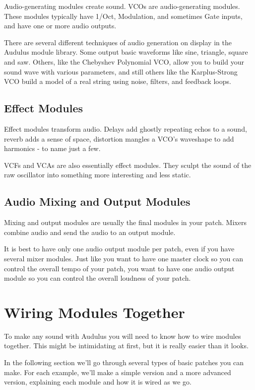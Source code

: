 \documentclass[11pt]{book}
\begin{document}
Audio-generating modules create sound. VCOs are audio-generating modules. These modules typically have 1/Oct, Modulation, and sometimes Gate inputs, and have one or more audio outputs.

There are several different techniques of audio generation on display in the Audulus module library. Some output basic waveforms like sine, triangle, square and saw. Others, like the Chebyshev Polynomial VCO, allow you to build your sound wave with various parameters, and still others like the Karplus-Strong VCO build a model of a real string using noise, filters, and feedback loops.

\subsection{Effect Modules}

Effect modules transform audio. Delays add ghostly repeating echos to a sound, reverb adds a sense of space, distortion mangles a VCO's waveshape to add harmonics - to name just a few.

VCFs and VCAs are also essentially effect modules. They sculpt the sound of the raw oscillator into something more interesting and less static.

\subsection{Audio Mixing and Output Modules}

Mixing and output modules are usually the final modules in your patch. Mixers combine audio and send the audio to an output module.

It is best to have only one audio output module per patch, even if you have several mixer modules. Just like you want to have one master clock so you can control the overall tempo of your patch, you want to have one audio output module so you can control the overall loudness of your patch.


\section{Wiring Modules Together}

To make any sound with Audulus you will need to know how to wire modules together. This might be intimidating at first, but it is really easier than it looks.

In the following section we'll go through several types of basic patches you can make. For each example, we'll make a simple version and a more advanced version, explaining each module and how it is wired as we go.
\end{document}
